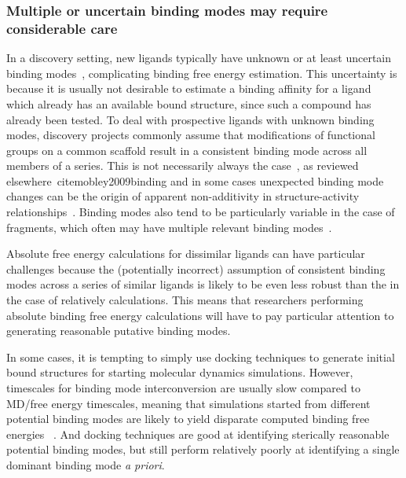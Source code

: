 \documentclass[9pt,bestpractices]{livecoms}
\begin{document}
\subsubsection{Multiple or uncertain binding modes may require considerable care}
\label{sec:multiple_binding_modes}
In a discovery setting, new ligands typically have unknown or at least uncertain binding modes~\cite{kaus2015how, plountprice2000analysis,mobley2009binding,calabro2016elucidation},  complicating binding free energy estimation.
This uncertainty is because it is usually not desirable to estimate a binding affinity for a ligand which already has an available bound structure, since such a compound has already been tested.
To deal with prospective ligands with unknown binding modes, discovery projects commonly assume that modifications of functional groups on a common scaffold result in a consistent binding mode across all members of a series.
This is not necessarily always the case~\cite{kaus2015how}, as reviewed elsewhere~cite{mobley2009binding} and in some cases unexpected binding mode changes can be the origin of apparent non-additivity in structure-activity relationships~\cite{calabro2016elucidation}.
Binding modes also tend to be particularly variable in the case of fragments, which often may have multiple relevant binding modes~\cite{}.

Absolute free energy calculations for dissimilar ligands can have particular challenges because the (potentially incorrect) assumption of consistent binding modes across a series of similar ligands is likely to be even less robust than the in the case of relatively calculations.
This means that researchers performing absolute binding free energy calculations will have to pay particular attention to generating reasonable putative binding modes.

In some cases, it is tempting to simply use docking techniques to generate initial bound structures for starting molecular dynamics simulations.
However, timescales for binding mode interconversion are usually slow compared to MD/free energy timescales, meaning that simulations started from different potential binding modes are likely to yield disparate computed binding free energies~\cite{mobley2006use, palma2012computation, mobley2012perspective, gill2018binding} .
And docking techniques are good at identifying sterically reasonable potential binding modes, but still perform relatively poorly at identifying a single dominant binding mode \emph{a priori}.~\cite{} 
\end{document}
